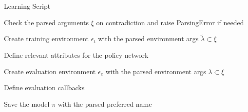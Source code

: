 \begin{algorithm}
	\caption{Learning Script}
	\label{alg:learn}
	
	Check the parsed arguments $\xi$ on contradiction and raise ParsingError if needed
	
	Create training environment $\epsilon_t$ with the parsed environment args $\tilde{\lambda} \subset \xi$
	
	Define relevant attributes for the policy network
	
	
	Create evaluation environment $\epsilon_e$ with the parsed environment args $\lambda \subset \xi$
	
	Define evaluation callbacks
	
	
	Save the model $\pi$ with the parsed preferred name
	
	
\end{algorithm}


